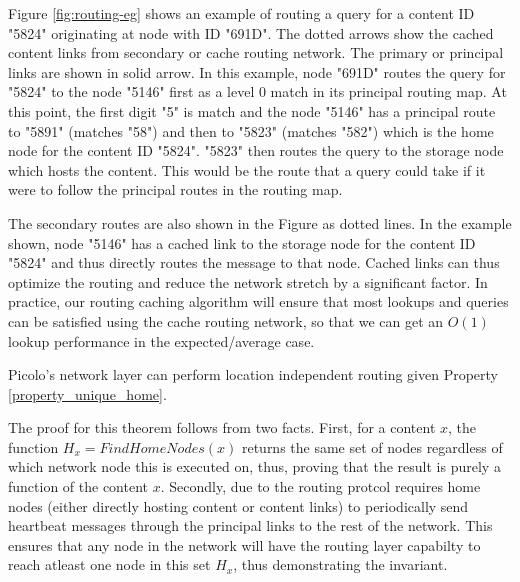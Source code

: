 Figure \ref{fig:routing-eg} shows an example of routing a query for a content ID "5824" originating at node with ID
"691D". The dotted arrows show the cached content links from secondary or cache routing network. The primary or
principal links are shown in solid arrow. In this example, node "691D" routes the query for "5824" to the node "5146"
first as a level 0 match in its principal routing map. At this point, the first digit "5" is match and the node "5146"
has a principal route to "5891" (matches "58") and then to "5823" (matches "582") which is the home node for the content
ID "5824". "5823" then routes the query to the storage node which hosts the content. This would be the route that a
query could take if it were to follow the principal routes in the routing map.

The secondary routes are also shown in the Figure as dotted lines. In the example shown, node "5146" has a cached link
to the storage node for the content ID "5824" and thus directly routes the message to that node. Cached links can thus
optimize the routing and reduce the network stretch by a significant factor.  In practice, our routing caching algorithm will
ensure that most lookups and queries can be satisfied using the cache routing network, so that we can get an \(O(1)\) lookup
performance in the expected/average case.


\begin{theorem}
Picolo's network layer can perform location independent routing given Property \ref{property_unique_home}.
\end{theorem}

The proof for this theorem follows from two facts. First, for a content \(x\), the function \(H_x = FindHomeNodes(x)\) returns
the same set of nodes regardless of which network node this is executed on, thus, proving that the result is purely a function
of the content \(x\). Secondly, due to the routing protcol requires home nodes (either directly hosting content or content links)
to periodically send heartbeat messages through the principal links to the rest of the network. This ensures that any node in the 
network will have the routing layer capabilty to reach atleast one node in this set \(H_x\), thus demonstrating the invariant. 

